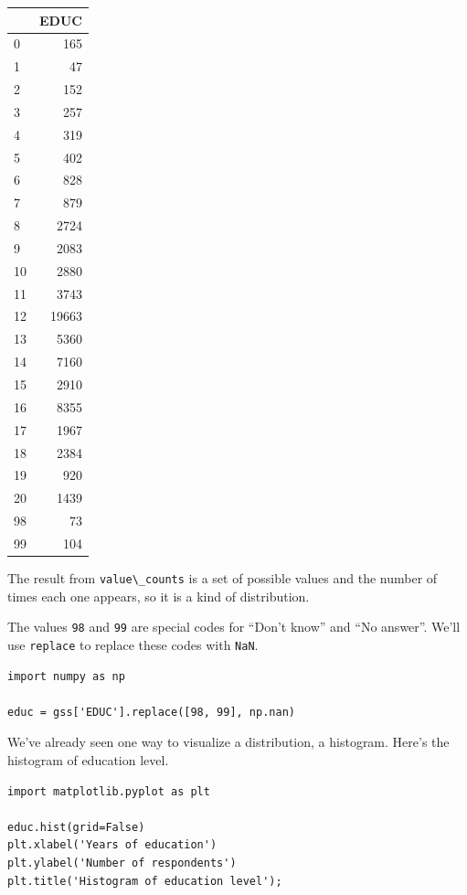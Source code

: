 \begin{tabular}{lr}
\midrule
{} &   EDUC \\
\midrule
0  &    165 \\
1  &     47 \\
2  &    152 \\
3  &    257 \\
4  &    319 \\
5  &    402 \\
6  &    828 \\
7  &    879 \\
8  &   2724 \\
9  &   2083 \\
10 &   2880 \\
11 &   3743 \\
12 &  19663 \\
13 &   5360 \\
14 &   7160 \\
15 &   2910 \\
16 &   8355 \\
17 &   1967 \\
18 &   2384 \\
19 &    920 \\
20 &   1439 \\
98 &     73 \\
99 &    104 \\
\midrule
\end{tabular}

The result from \passthrough{\lstinline!value\_counts!} is a set of
possible values and the number of times each one appears, so it is a
kind of distribution.

The values \passthrough{\lstinline!98!} and \passthrough{\lstinline!99!}
are special codes for ``Don't know'' and ``No answer''. We'll use
\passthrough{\lstinline!replace!} to replace these codes with
\passthrough{\lstinline!NaN!}.

\begin{lstlisting}[]
import numpy as np

educ = gss['EDUC'].replace([98, 99], np.nan)
\end{lstlisting}

We've already seen one way to visualize a distribution, a histogram.
Here's the histogram of education level.

\begin{lstlisting}[]
import matplotlib.pyplot as plt

educ.hist(grid=False)
plt.xlabel('Years of education')
plt.ylabel('Number of respondents')
plt.title('Histogram of education level');
\end{lstlisting}

